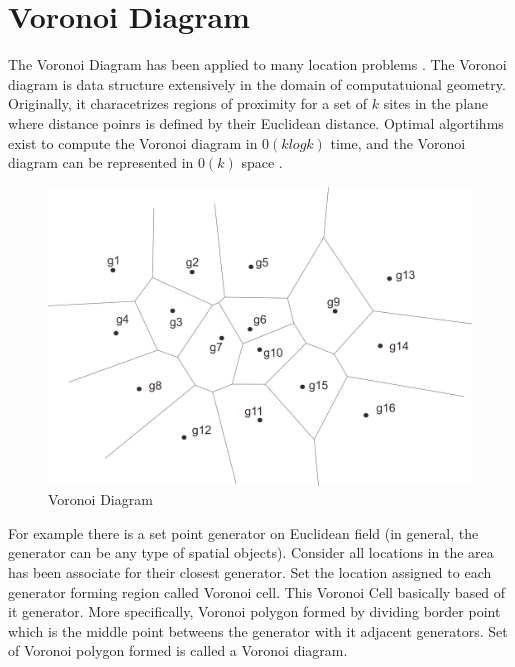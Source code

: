 \section{Voronoi Diagram}
The Voronoi Diagram has been applied to many location problems \cite{okabe2000}. The Voronoi diagram is data structure extensively in the domain of computatuional geometry. Originally, it characetrizes regions of proximity for a set of $k$ sites in the plane where distance poinrs is defined by their Euclidean distance. Optimal algortihms exist to compute the Voronoi diagram in $0(k log k)$ time, and the Voronoi diagram can be represented in $0(k)$ space \cite{erwig2000}.

\begin{figure}[H]
    \centering
    \includegraphics[scale=0.4]{voronoi-diagram.png}
    \caption{Voronoi Diagram}
    \label{fig:my_label}
\end{figure}

For example there is a set point generator on Euclidean field (in general, the generator can be any type of spatial objects). Consider all locations in the area has been associate for their closest generator. Set the location assigned to each generator forming region called Voronoi cell. This Voronoi Cell basically based of it generator. More specifically, Voronoi polygon formed by dividing border point which is the middle point betweens the generator with it adjacent generators. Set of Voronoi polygon formed is called a Voronoi diagram.

